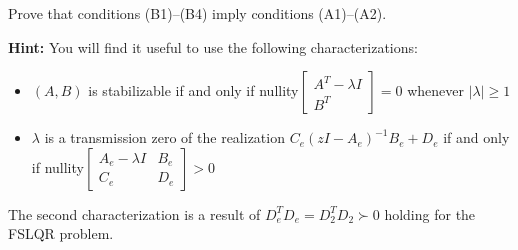 $\,$

Prove that conditions (B1)--(B4) imply conditions (A1)--(A2).

\textbf{Hint:}
You will find it useful to use the following characterizations:

\begin{itemize}
    \item
    $(A,B)$ is stabilizable if and only if nullity$\begin{bmatrix} A^T - \lambda I \\ B^T \end{bmatrix} = 0$ whenever $|\lambda| \geq 1$
    
    \item
    $\lambda$ is a transmission zero of the realization $C_e (zI - A_e)^{-1} B_e + D_e$ if and only if nullity$\begin{bmatrix} A_e - \lambda I & B_e \\ C_e & D_e \end{bmatrix} > 0$
\end{itemize}

The second characterization is a result of $D_e^T D_e = D_2^T D_2 \succ 0$ holding for the FSLQR problem. 
